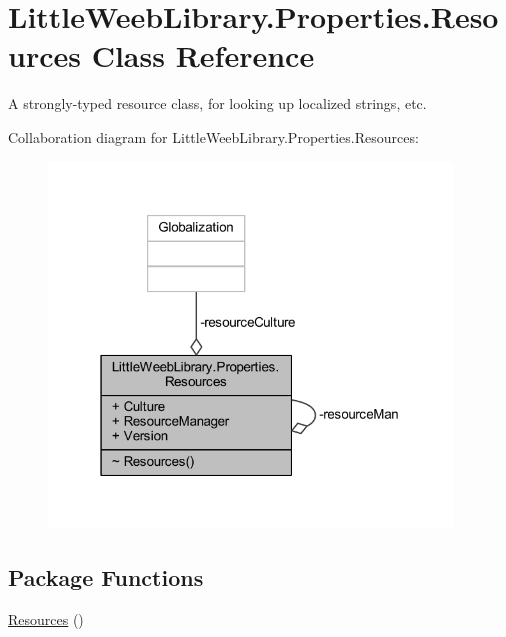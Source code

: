 \hypertarget{class_little_weeb_library_1_1_properties_1_1_resources}{}\section{Little\+Weeb\+Library.\+Properties.\+Resources Class Reference}
\label{class_little_weeb_library_1_1_properties_1_1_resources}


A strongly-\/typed resource class, for looking up localized strings, etc.  




Collaboration diagram for Little\+Weeb\+Library.\+Properties.\+Resources\+:\nopagebreak
\begin{figure}[H]
\begin{center}
\leavevmode
\includegraphics[width=304pt]{class_little_weeb_library_1_1_properties_1_1_resources__coll__graph}
\end{center}
\end{figure}
\subsection*{Package Functions}
\begin{DoxyCompactItemize}
\item 
\mbox{\hyperlink{class_little_weeb_library_1_1_properties_1_1_resources_ae0439f3d53efcbb58f6259478db62e9e}{Resources}} ()
\end{DoxyCompactItemize}
